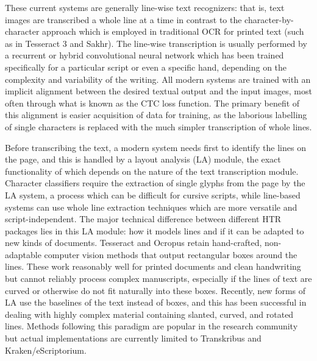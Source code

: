 These current systems are generally line-wise text recognizers: that is, text
images are transcribed a whole line at a time in contrast to the
character-by-character approach which is employed in traditional OCR for
printed text (such as in Tesseract 3 and Sakhr). The line-wise transcription is
usually performed by a recurrent or hybrid convolutional neural network which
has been trained specifically for a particular script or even a specific hand,
depending on the complexity and variability of the writing. All modern systems
are trained with an implicit alignment between the desired textual output and
the input images, most often through what is known as the CTC loss function\cite{graves2006connectionist}.
The primary benefit of this alignment is easier acquisition of data for
training, as the laborious labelling of single characters is replaced with the
much simpler transcription of whole lines. 

Before transcribing the text, a modern system needs first to identify the lines
on the page, and this is handled by a layout analysis (LA) module, the exact
functionality of which depends on the nature of the text transcription module.
Character classifiers require the extraction of single glyphs from the page by
the LA system, a process which can be difficult for cursive scripts, while
line-based systems can use whole line extraction techniques which are more
versatile and script-independent. The major technical difference between
different HTR packages lies in this LA module: how it models lines and if it
can be adapted to new kinds of documents. Tesseract and Ocropus retain
hand-crafted, non-adaptable computer vision methods that output rectangular
boxes around the lines. These work reasonably well for printed documents and
clean handwriting but cannot reliably process complex manuscripts, especially
if the lines of text are curved or otherwise do not fit naturally into these
boxes. Recently, new forms of LA use the baselines of the text instead of
boxes, and this has been successful in dealing with highly complex material
containing slanted, curved, and rotated lines\cite{diem2017cbad}. Methods following this
paradigm are popular in the research community but actual implementations are
currently limited to Transkribus and Kraken/eScriptorium. 

